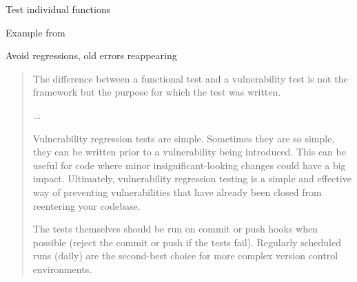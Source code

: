 \documentclass[Screen16to9,17pt]{foils}
\begin{document}
\begin{list1}
\item Test individual functions
\item Example from 
\item Avoid regressions, old errors reappearing
\end{list1}



\begin{quote}
The difference between a functional test and a vulnerability test is not the framework
but the purpose for which the test was written.

...

Vulnerability regression tests are simple. Sometimes they are so simple, they can be written prior to a vulnerability being introduced. This can be useful for code where minor insignificant-looking changes could have a big impact. Ultimately, vulnerability regression testing is a simple and effective way of preventing vulnerabilities that have already been closed from reentering your codebase.

The tests themselves should be run on commit or push hooks when possible (reject the commit or push if the tests fail). Regularly scheduled runs (daily) are the second-best choice for more complex version control environments.
\end{quote}



\slidenext{}
\end{document}
